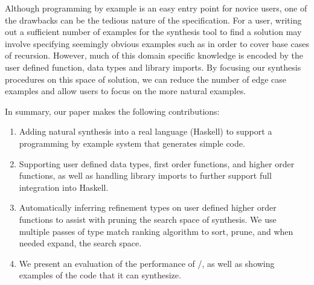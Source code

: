 Although programming by example is an easy entry point for novice
users, one of the drawbacks can be the tedious nature of the
specification.  For a user, writing out a sufficient number of
examples for the synthesis tool to find a solution may involve
specifying seemingly obvious examples such as \codeinline{[]->[]} in
order to cover base cases of recursion.  However, much of this domain
specific knowledge is encoded by the user defined function, data types
and library imports.  By focusing our synthesis procedures on this
space of solution, we can reduce the number of edge case examples and
allow users to focus on the more natural examples.

In summary, our paper makes the following contributions:

\begin{enumerate}[topsep=0pt]
\item Adding natural synthesis into a real language (Haskell) to support a programming by example system that generates simple code.
\item Supporting user defined data types, first order functions, and higher order functions, as well as handling library imports to further support full integration into Haskell.
\item Automatically inferring refinement types on user defined higher order functions to assist with pruning the search space of synthesis. We use multiple passes of type match ranking algorithm to sort, prune, and when needed expand, the search space.
\item We present an evaluation of the performance of \ourTool/, as well as showing examples of the code that it can synthesize.
\end{enumerate}
